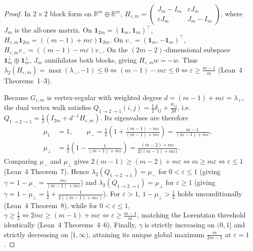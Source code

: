 \documentclass[11pt,a4paper]{article}
\theoremstyle{definition}
\theoremstyle{remark}
\newcommand{\RR}{\mathbb{R}}
\begin{document}
\begin{proof}
In $2\times 2$ block form on $\RR^m \oplus \RR^m$, $H_{\varepsilon,m} = \begin{pmatrix} J_m - I_m & \varepsilon J_m \\ \varepsilon J_m & J_m - I_m \end{pmatrix}$, where $J_m$ is the all-ones matrix. On $\mathbf{1}_{2m} = (\mathbf{1}_m, \mathbf{1}_m)^\top$, $H_{\varepsilon,m}\mathbf{1}_{2m} = ((m-1)+m\varepsilon)\mathbf{1}_{2m}$. On $v_- = (\mathbf{1}_m, -\mathbf{1}_m)^\top$, $H_{\varepsilon,m} v_- = ((m-1)-m\varepsilon)v_-$. On the $(2m-2)$-dimensional subspace $\mathbf{1}_m^\perp \oplus \mathbf{1}_m^\perp$, $J_m$ annihilates both blocks, giving $H_{\varepsilon,m} w = -w$. Thus $\lambda_2(H_{\varepsilon,m}) = \max(\lambda_-, -1) \le 0 \iff (m-1) - m\varepsilon \le 0 \iff \varepsilon \ge \frac{m-1}{m}$ (Lean~4 Theorems~1--3).

Because $G_{\varepsilon,m}$ is vertex-regular with weighted degree $d = (m-1)+m\varepsilon = \lambda_+$, the dual vertex walk satisfies $Q_{1\to 2\to 1}(i, j) = \frac{1}{2}\delta_{ij} + \frac{w_{ij}}{2d}$, i.e.\ $Q_{1\to 2\to 1} = \frac{1}{2}(I_{2m} + d^{-1}H_{\varepsilon,m})$. Its eigenvalues are therefore
\begin{align*}
  \mu_1 &= 1, \qquad
  \mu_- = \frac{1}{2}\!\left(1 + \frac{(m-1)-m\varepsilon}{(m-1)+m\varepsilon}\right) = \frac{m-1}{(m-1)+m\varepsilon}, \\
  \mu_\perp &= \frac{1}{2}\!\left(1 - \frac{1}{(m-1)+m\varepsilon}\right) = \frac{(m-2)+m\varepsilon}{2\bigl((m-1)+m\varepsilon\bigr)}.
\end{align*}
Comparing $\mu_-$ and $\mu_\perp$ gives $2(m-1) \ge (m-2)+m\varepsilon \iff m \ge m\varepsilon \iff \varepsilon \le 1$ (Lean~4 Theorem~7). Hence $\lambda_2(Q_{1\to 2\to 1}) = \mu_-$ for $0 < \varepsilon \le 1$ (giving $\gamma = 1 - \mu_- = \frac{m\varepsilon}{(m-1)+m\varepsilon}$) and $\lambda_2(Q_{1\to 2\to 1}) = \mu_\perp$ for $\varepsilon \ge 1$ (giving $\gamma = 1 - \mu_\perp = \frac{1}{2} + \frac{1}{2((m-1)+m\varepsilon)}$). For $\varepsilon > 1$, $1 - \mu_\perp > \frac{1}{2}$ holds unconditionally (Lean~4 Theorem~8), while for $0 < \varepsilon \le 1$, $\gamma \ge \frac{1}{2} \iff 2m\varepsilon \ge (m-1)+m\varepsilon \iff \varepsilon \ge \frac{m-1}{m}$, matching the Lorentzian threshold identically (Lean~4 Theorems~4--6). Finally, $\gamma$ is strictly increasing on $(0, 1]$ and strictly decreasing on $[1, \infty)$, attaining its unique global maximum $\frac{m}{2m-1}$ at $\varepsilon = 1$.
\end{proof}
\end{document}
